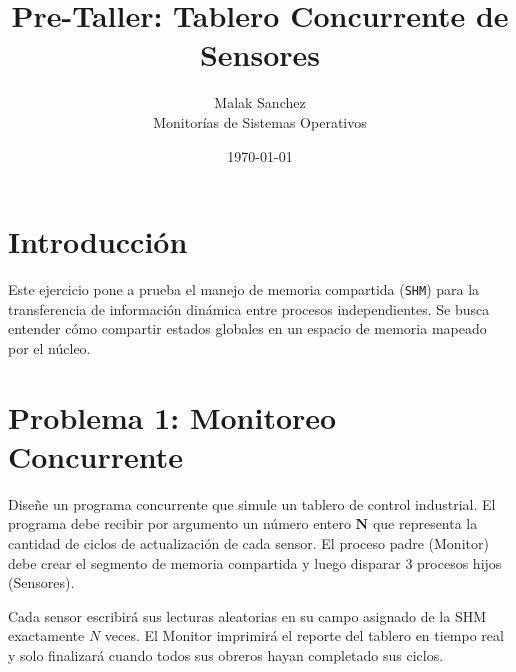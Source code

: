 \documentclass[12pt,a4paper]{article}
\title{\textbf{Pre-Taller: Tablero Concurrente de Sensores}}
\author{Malak Sanchez \\ \small Monitorías de Sistemas Operativos}
\date{\today}
\begin{document}
\maketitle

\section*{Introducción}
Este ejercicio pone a prueba el manejo de memoria compartida (\texttt{SHM}) para la transferencia de información dinámica entre procesos independientes. Se busca entender cómo compartir estados globales en un espacio de memoria mapeado por el núcleo.

\section*{Problema 1: Monitoreo Concurrente}
Diseñe un programa concurrente que simule un tablero de control industrial. El programa debe recibir por argumento un número entero $\mathbf{N}$ que representa la cantidad de ciclos de actualización de cada sensor. El proceso padre (Monitor) debe crear el segmento de memoria compartida y luego disparar 3 procesos hijos (Sensores).

Cada sensor escribirá sus lecturas aleatorias en su campo asignado de la SHM exactamente $N$ veces. El Monitor imprimirá el reporte del tablero en tiempo real y solo finalizará cuando todos sus obreros hayan completado sus ciclos.

\begin{center}
\end{center}
\end{document}
